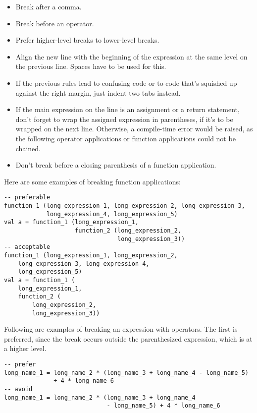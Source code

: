 \begin{itemize}
\item Break after a comma. 
\item Break before an operator. 
\item Prefer higher-level breaks to lower-level breaks. 
\item Align the new line with the beginning of the expression at the same level on the previous line. Spaces have to be used for this. 
\item If the previous rules lead to confusing code or to code that's squished up against the right margin, just indent two tabs instead. 
\item If the main expression on the line is an assignment or a return statement, don't forget to wrap the assigned expression in parentheses, if it's to be wrapped on the next line. Otherwise, a compile-time error would be raised, as the following operator applications or function applications could not be chained. 
\item Don't break before a closing parenthesis of a function application.  
\end{itemize}

\example Here are some examples of breaking function applications: 

\begin{lstlisting}
-- preferable
function_1 (long_expression_1, long_expression_2, long_expression_3,
            long_expression_4, long_expression_5)
val a = function_1 (long_expression_1,
                    function_2 (long_expression_2,
                                long_expression_3))
-- acceptable
function_1 (long_expression_1, long_expression_2, 
    long_expression_3, long_expression_4, 
    long_expression_5)
val a = function_1 (
    long_expression_1,
    function_2 (
        long_expression_2,
        long_expression_3))
\end{lstlisting}

\example Following are examples of breaking an expression with operators. The first is preferred, since the break occurs outside the parenthesized expression, which is at a higher level. 

\begin{lstlisting}
-- prefer
long_name_1 = long_name_2 * (long_name_3 + long_name_4 - long_name_5)
              + 4 * long_name_6
-- avoid
long_name_1 = long_name_2 * (long_name_3 + long_name_4 
                             - long_name_5) + 4 * long_name_6
\end{lstlisting}

